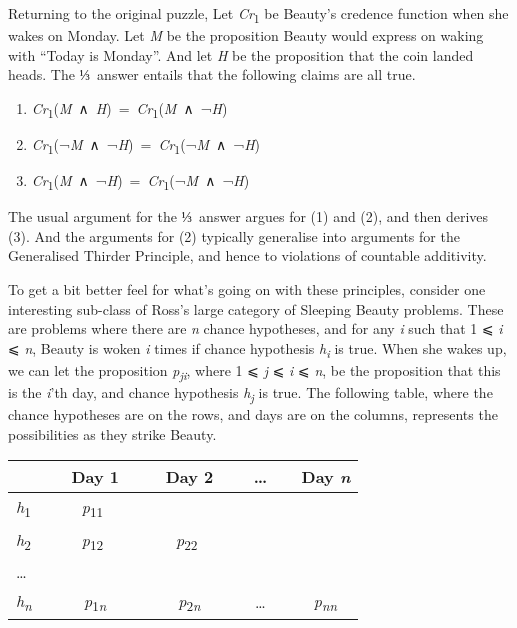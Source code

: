 \documentclass[
  11pt,
  letterpaper,
  DIV=11,
  numbers=noendperiod,
  twoside]{scrartcl}
\providecommand{\tightlist}{%
  \setlength{\itemsep}{0pt}\setlength{\parskip}{0pt}}\usepackage{longtable,booktabs,array}
\begin{document}
Returning to the original puzzle, Let \emph{Cr}\textsubscript{1} be
Beauty's credence function when she wakes on Monday. Let \emph{M} be the
proposition Beauty would express on waking with ``Today is Monday''. And
let \emph{H} be the proposition that the coin landed heads. The ⅓~answer
entails that the following claims are all true.

\begin{enumerate}
\def\labelenumi{\arabic{enumi}.}
\tightlist
\item
  \emph{Cr}\textsubscript{1}(\emph{M}~∧~\emph{H})~=~\emph{Cr}\textsubscript{1}(\emph{M}~∧~¬\emph{H})
\item
  \emph{Cr}\textsubscript{1}(¬\emph{M}~∧~¬\emph{H})~=~\emph{Cr}\textsubscript{1}(¬\emph{M}~∧~¬\emph{H})
\item
  \emph{Cr}\textsubscript{1}(\emph{M}~∧~¬\emph{H})~=~\emph{Cr}\textsubscript{1}(¬\emph{M}~∧~¬\emph{H})
\end{enumerate}

The usual argument for the ⅓~answer argues for (1) and (2), and then
derives (3). And the arguments for (2) typically generalise into
arguments for the Generalised Thirder Principle, and hence to violations
of countable additivity.

To get a bit better feel for what's going on with these principles,
consider one interesting sub-class of Ross's large category of Sleeping
Beauty problems. These are problems where there are \emph{n} chance
hypotheses, and for any \emph{i} such that 1 ⩽ \emph{i} ⩽ \emph{n},
Beauty is woken \emph{i} times if chance hypothesis
\emph{h\textsubscript{i}} is true. When she wakes up, we can let the
proposition \emph{p\textsubscript{ji}}, where 1 ⩽ \emph{j} ⩽ \emph{i} ⩽
\emph{n}, be the proposition that this is the \emph{i}'th day, and
chance hypothesis \emph{h\textsubscript{j}} is true. The following
table, where the chance hypotheses are on the rows, and days are on the
columns, represents the possibilities as they strike Beauty.

\begin{longtable}[]{@{}lcccc@{}}
\toprule\noalign{}
~ & ~ Day 1 ~ & ~ Day 2 ~ & ~\ldots~ & ~Day \emph{n} \\
\midrule\noalign{}
\endhead
\bottomrule\noalign{}
\endlastfoot
\emph{h}\textsubscript{1}~ & ~\emph{p}\textsubscript{11} ~ & ~ ~ & ~ ~ &
~ \\
\emph{h}\textsubscript{2}~ & ~\emph{p}\textsubscript{12} ~ &
~\emph{p}\textsubscript{22} ~ & ~ ~ & ~ \\
\ldots{} ~ & ~ ~ & ~ ~ & ~ ~ & ~ \\
\emph{h\textsubscript{n}}~ & ~\emph{p}\textsubscript{1\emph{n}}~ &
~\emph{p}\textsubscript{2\emph{n}}~ & ~\ldots~ &
~\emph{p\textsubscript{nn}} \\
\end{longtable}
\end{document}
